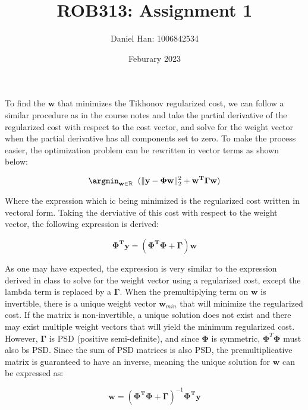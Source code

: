 

\title{ROB313: Assignment 1}
\author{Daniel Han: 1006842534}
\date{Feburary 2023}



\maketitle


To find the $\textbf{w}$ that minimizes the Tikhonov regularized cost, we can follow a similar procedure as in the course notes and take the partial derivative of the regularized cost with respect to the cost vector, and solve for the weight vector when the partial derivative has all components set to zero. To make the process easier, the optimization problem can be rewritten in vector terms as shown below:

\begin{equation}
\argmin_{\textbf{w} \in \mathbb{R}} \;\;  (\| \textbf{y} - \mathbf{\Phi}\mathbf{w} \|_2^2 + \mathbf{w^T}\mathbf{\Gamma}\mathbf{w})
\end{equation}

Where the expression which ic being minimized is the regularized cost written in vectoral form. Taking the derviative of this cost with respect to the weight vector, the following expression is derived:

\begin{equation}
\mathbf{\Phi^T}\mathbf{y} = (\mathbf{\Phi^T \Phi} + \mathbf{\Gamma})\mathbf{w}
\end{equation}

As one may have expected, the expression is very similar to the expression derived in class to solve for the weight vector using a regularized cost, except the lambda term is replaced by a $\mathbf{\Gamma}$. When the premultiplying term on $\mathbf{w}$ is invertible, there is a unique weight vector $\mathbf{w}_{min}$ that will minimize the regularized cost. If the matrix is non-invertible, a unique solution does not exist and there may exist multiple weight vectors that will yield the minimum regularized cost. However, $\boldsymbol\Gamma$ is PSD (positive semi-definite), and since $\boldsymbol\Phi$ is symmetric, $\boldsymbol\Phi^T \boldsymbol\Phi$ must also bs PSD. Since the sum of PSD matrices is also PSD, the premultiplicative matrix is guaranteed to have an inverse, meaning the unique solution for $\mathbf{w}$ can be expressed as:

\begin{equation}
\mathbf{w} = (\mathbf{\Phi^T \Phi} + \mathbf{\Gamma})^{-1}\mathbf{\Phi^T}\mathbf{y}
\end{equation}

